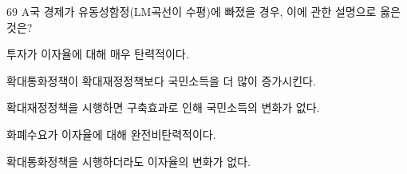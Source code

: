 \begin{question}{69}
A국 경제가 유동성함정(LM곡선이 수평)에 빠졌을 경우, 이에 관한 설명으로 옳은 것은?
\begin{choices}
  \item 투자가 이자율에 대해 매우 탄력적이다.
  \item 확대통화정책이 확대재정정책보다 국민소득을 더 많이 증가시킨다.
  \item 확대재정정책을 시행하면 구축효과로 인해 국민소득의 변화가 없다.
  \item 화폐수요가 이자율에 대해 완전비탄력적이다.
  \item 확대통화정책을 시행하더라도 이자율의 변화가 없다.
\end{choices}
\end{question}

